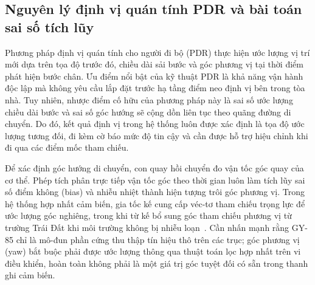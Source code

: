 \subsection{Nguyên lý định vị quán tính PDR và bài toán sai số tích lũy}
Phương pháp định vị quán tính cho người đi bộ (PDR) thực hiện ước lượng vị trí mới dựa trên tọa độ trước đó, chiều dài sải bước và góc phương vị tại thời điểm phát hiện bước chân. Ưu điểm nổi bật của kỹ thuật PDR là khả năng vận hành độc lập mà không yêu cầu lắp đặt trước hạ tầng điểm neo định vị bên trong tòa nhà. Tuy nhiên, nhược điểm cố hữu của phương pháp này là sai số ước lượng chiều dài bước và sai số góc hướng sẽ cộng dồn liên tục theo quãng đường di chuyển. Do đó, kết quả định vị trong hệ thống luôn được xác định là tọa độ ước lượng tương đối, đi kèm cờ báo mức độ tin cậy và cần được hỗ trợ hiệu chỉnh khi đi qua các điểm mốc tham chiếu.

Để xác định góc hướng di chuyển, con quay hồi chuyển đo vận tốc góc quay của cơ thể. Phép tích phân trực tiếp vận tốc góc theo thời gian luôn làm tích lũy sai số điểm không (bias) và nhiễu nhiệt thành hiện tượng trôi góc phương vị. Trong hệ thống hợp nhất cảm biến, gia tốc kế cung cấp véc-tơ tham chiếu trọng lực để ước lượng góc nghiêng, trong khi từ kế bổ sung góc tham chiếu phương vị từ trường Trái Đất khi môi trường không bị nhiễu loạn~\cite{gyro}. Cần nhấn mạnh rằng GY-85 chỉ là mô-đun phần cứng thu thập tín hiệu thô trên các trục; góc phương vị (yaw) bắt buộc phải được ước lượng thông qua thuật toán lọc hợp nhất trên vi điều khiển, hoàn toàn không phải là một giá trị góc tuyệt đối có sẵn trong thanh ghi cảm biến.

